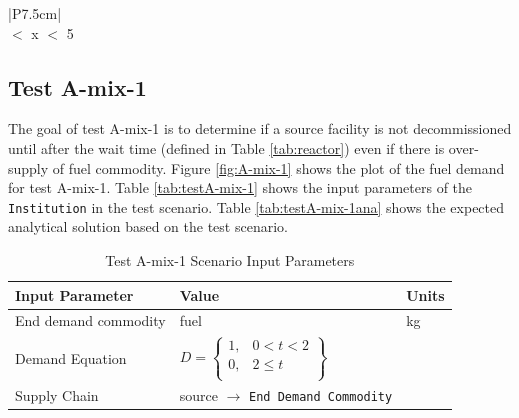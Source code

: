 \documentclass[11pt,letterpaper]{article}
\begin{document}
\begin{table}[H]
	\centering
	\caption{Test A-dep-2 Base Test Acceptance}
	\label{tab:test-A-dep-2 base}
	\begin{tabular}{|P{7.5cm}|}
		\hline
		\textbf{}\\
		 $<$ x $<$ 5 \\
		\hline
	\end{tabular}
\end{table}

\subsection{Test A-mix-1}
The goal of test A-mix-1 is to determine if a source facility is not decommissioned until after the wait time (defined in Table \ref{tab:reactor}) even if there is over-supply of fuel commodity. Figure \ref{fig:A-mix-1} shows the plot of the fuel demand for test A-mix-1. 
Table \ref{tab:testA-mix-1} shows the input parameters of the \texttt{Institution} in the test scenario. Table \ref{tab:testA-mix-1ana} shows the expected analytical solution based on the test scenario. 

\begin{table}[H]
	\centering
	\caption{Test A-mix-1 Scenario Input Parameters }
	\label{tab:test_A-mix-1}
	\begin{tabular}{|l|l|l|}
		\hline
		\textbf{Input Parameter} & \textbf{Value} & \textbf{Units} \\
		\hline
		End demand commodity & fuel & kg \\
		Demand Equation & $D = \left\{
		\begin{array}{ll}
			1 , & 0 < t < 2 \\
			0 , &  2 \leq t  \\
		\end{array}\right\}$
		& \\
		Supply Chain & source $\rightarrow$ \texttt{End Demand Commodity} &  \\
		\hline
		\end{tabular}
\end{table}
\end{document}
